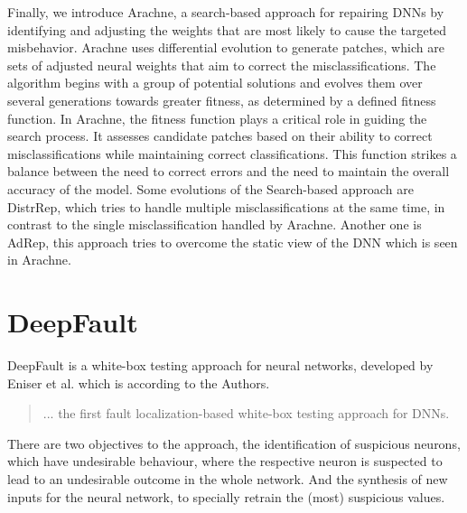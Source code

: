 Finally, we introduce Arachne\cite{sohn_arachne_2023}, a search-based approach for repairing DNNs by identifying and adjusting the weights that are most likely to cause the targeted misbehavior.
Arachne uses differential evolution to generate patches, which are sets of adjusted neural weights that aim to correct the misclassifications.
The algorithm begins with a group of potential solutions and evolves them over several generations towards greater fitness, as determined by a defined fitness function.
In Arachne, the fitness function plays a critical role in guiding the search process.
It assesses candidate patches based on their ability to correct misclassifications while maintaining correct classifications.
This function strikes a balance between the need to correct errors and the need to maintain the overall accuracy of the model.
Some evolutions of the Search-based approach are DistrRep\cite{calsi_distributed_2023}, which tries to handle multiple misclassifications at the same time, in contrast to the single misclassification handled by Arachne.
Another one is AdRep\cite{li_calsi_adaptive_2023}, this approach tries to overcome the static view of the DNN which is seen in Arachne.

\section{DeepFault}\label{sec:deepfault}
DeepFault\cite{eniser_deepfault_2019} is a white-box testing approach for neural networks, developed by Eniser et al. which is according to the Authors.
\begin{quote}
    ... the first fault localization-based white-box testing approach for DNNs.
\end{quote}
There are two objectives to the approach, the identification of suspicious neurons, which have undesirable behaviour, where the respective neuron is suspected to lead to an undesirable outcome in the whole network.
And the synthesis of new inputs for the neural network, to specially retrain the (most) suspicious values.

